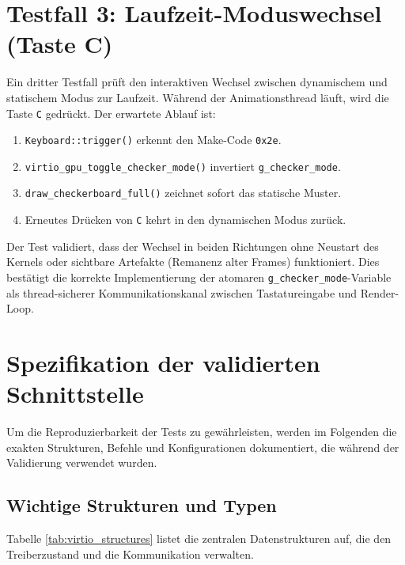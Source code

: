 \section{Testfall 3: Laufzeit-Moduswechsel (Taste C)}

Ein dritter Testfall prüft den interaktiven Wechsel zwischen dynamischem und
statischem Modus zur Laufzeit. Während der Animationsthread läuft, wird die
Taste \texttt{C} gedrückt. Der erwartete Ablauf ist:
\begin{enumerate}
    \item \texttt{Keyboard::trigger()} erkennt den Make-Code \texttt{0x2e}.
    \item \texttt{virtio\_gpu\_toggle\_checker\_mode()} invertiert \texttt{g\_checker\_mode}.
    \item \texttt{draw\_checkerboard\_full()} zeichnet sofort das statische Muster.
    \item Erneutes Drücken von \texttt{C} kehrt in den dynamischen Modus zurück.
\end{enumerate}

Der Test validiert, dass der Wechsel in beiden Richtungen ohne Neustart des
Kernels oder sichtbare Artefakte (Remanenz alter Frames) funktioniert. Dies
bestätigt die korrekte Implementierung der atomaren
\texttt{g\_checker\_mode}-Variable als thread-sicherer Kommunikationskanal
zwischen Tastatureingabe und Render-Loop.

\section{Spezifikation der validierten Schnittstelle}

Um die Reproduzierbarkeit der Tests zu gewährleisten, werden im Folgenden die
exakten Strukturen, Befehle und Konfigurationen dokumentiert, die während der
Validierung verwendet wurden.

\subsection{Wichtige Strukturen und Typen}

Tabelle \ref{tab:virtio_structures} listet die zentralen Datenstrukturen auf,
die den Treiberzustand und die Kommunikation verwalten.

